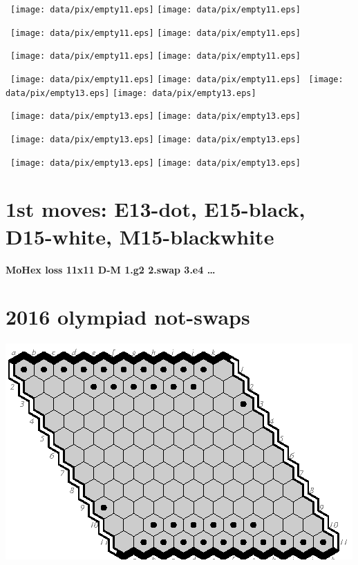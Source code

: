 \documentclass{article}
\begin{document}
\noindent\
\texttt{[image: data/pix/empty11.eps]}\hspace*{-2cm}
\texttt{[image: data/pix/empty11.eps]}\vfill

\noindent\
\texttt{[image: data/pix/empty11.eps]}\hspace*{-2cm}
\texttt{[image: data/pix/empty11.eps]}\vfill

\noindent\
\texttt{[image: data/pix/empty11.eps]}\hspace*{-2cm}
\texttt{[image: data/pix/empty11.eps]}\vfill

\noindent\
\texttt{[image: data/pix/empty11.eps]}\hspace*{-2cm}
\texttt{[image: data/pix/empty11.eps]}
\newpage
\noindent\
\texttt{[image: data/pix/empty13.eps]}\hspace*{-2cm}
\texttt{[image: data/pix/empty13.eps]}

\noindent\
\texttt{[image: data/pix/empty13.eps]}\hspace*{-2cm}
\texttt{[image: data/pix/empty13.eps]}

\noindent\
\texttt{[image: data/pix/empty13.eps]}\hspace*{-2cm}
\texttt{[image: data/pix/empty13.eps]}

\noindent\
\texttt{[image: data/pix/empty13.eps]}\hspace*{-2cm}
\texttt{[image: data/pix/empty13.eps]}

\newpage
\section*{1st moves: E13-dot, E15-black, D15-white, M15-blackwhite}
\vfill

{\large\bf MoHex loss 11x11 D-M 1.g2 2.swap 3.e4 \ldots}
\vfill\vfill
\section*{2016 olympiad not-swaps}

\vfill\vfill\vfill

\includegraphics[scale=2]{data/pix/swaps11.eps}\vfill\vfill
\end{document}
